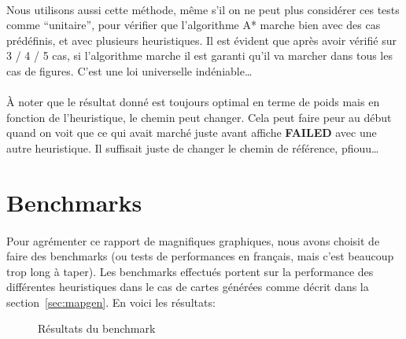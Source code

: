 \documentclass[french]{article}
\begin{document}
\paragraph{} Nous utilisons aussi cette méthode, même s'il on ne peut plus
considérer ces tests comme ``unitaire'', pour vérifier que l'algorithme A*
marche bien avec des cas prédéfinis, et avec plusieurs heuristiques. Il est
évident que après avoir vérifié sur 3 / 4 / 5 cas, si l'algorithme marche il
est garanti qu'il va marcher dans tous les cas de figures. C'est une loi
universelle indéniable\ldots

\paragraph{} À noter que le résultat donné est toujours optimal en terme de
poids mais en fonction de l'heuristique, le chemin peut changer. Cela peut
faire peur au début quand on voit que ce qui avait marché juste avant affiche
\textbf{FAILED} avec une autre heuristique. Il suffisait juste de changer le
chemin de référence, pfiouu\ldots

\section{Benchmarks}

\paragraph{} Pour agrémenter ce rapport de magnifiques graphiques, nous avons
choisit de faire des benchmarks (ou tests de performances en français, mais
c'est beaucoup trop long à taper). Les benchmarks effectués portent sur la
performance des différentes heuristiques dans le cas de cartes générées comme
décrit dans la section~\ref{sec:mapgen}. En voici les résultats:

\begin{figure}[H]
	\centering
	{
	}
	\caption{Résultats du benchmark}
	\label{fig:benchmarks}
\end{figure}
\end{document}
